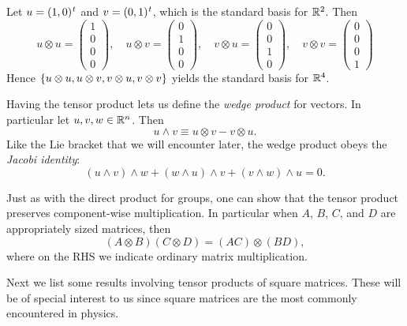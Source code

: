 \begin{example}{}{}
Let $u=\trans{(1,0)}$ and $v=\trans{(0,1)}$, which is the standard
basis for $\mathbb{R}^2$. Then
$$
u \otimes u=\left(\begin{array}{l}
1 \\
0 \\
0 \\
0
\end{array}\right), \quad u \otimes v=\left(\begin{array}{l}
0 \\
1 \\
0 \\
0
\end{array}\right), \quad v \otimes u=\left(\begin{array}{l}
0 \\
0 \\
1 \\
0
\end{array}\right), \quad v \otimes v=\left(\begin{array}{l}
0 \\
0 \\
0 \\
1
\end{array}\right)
$$
Hence $\left\{u\otimes u, u\otimes v, v\otimes u, v\otimes v\right\}$
yields the standard basis for $\mathbb{R}^4$.
\end{example}

Having the tensor product lets us define the 
{\it wedge product} for vectors.
In particular let $u,v,w\in\mathbb{R}^n$. Then
\begin{equation}
u\wedge v \equiv u\otimes v-v\otimes u.
\end{equation}
Like the Lie bracket that we will encounter later,
the wedge product obeys the {\it Jacobi identity}:
\begin{equation}
(u\wedge v)\wedge w
+(w\wedge u)\wedge v
+(v\wedge w)\wedge u=0.
\end{equation}

Just as with the direct product for groups, one can show that
the tensor product preserves component-wise multiplication.
In particular when $A$, $B$, $C$, and $D$ are appropriately
sized matrices, then
\begin{equation}\label{eq:mixedProduct}
(A\otimes B)(C\otimes D)=(AC)\otimes(BD),
\end{equation}
where on the RHS we indicate ordinary matrix multiplication.

Next we list some results involving tensor products of square matrices. These
will be of special interest to us since square matrices are the most commonly
encountered in physics.

